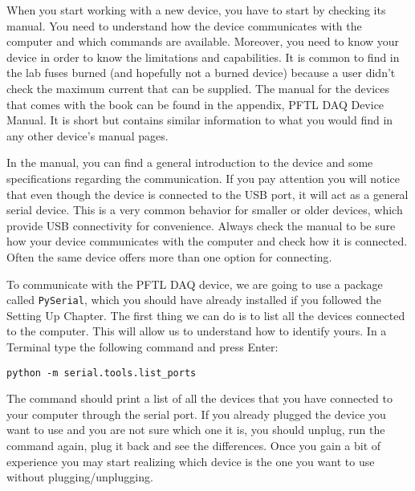 

When you start working with a new device, you have to start by checking
its manual. You need to understand how the device communicates with the
computer and which commands are available. Moreover, you need to know
your device in order to know the limitations and capabilities. It is
common to find in the lab fuses burned (and hopefully not a burned
device) because a user didn't check the maximum current that can be
supplied. The manual for the devices that comes with the book can be
found in the appendix, PFTL DAQ Device Manual. It is short but contains similar information to what you
would find in any other device's manual pages.

In the manual, you can find a general introduction to the device and
some specifications regarding the communication. If you pay attention
you will notice that even though the device is connected to the {USB}
port, it will act as a general serial device. This is a very common
behavior for smaller or older devices, which provide {USB} connectivity
for convenience. Always check the manual to be sure how your device
communicates with the computer and check how it is connected. Often the
same device offers more than one option for connecting.

To communicate with the {PFTL} {DAQ} device, we are going to use a
package called \texttt{PySerial}, which you should have already
installed if you followed the Setting Up Chapter. The first
thing we can do is to list all the devices connected to the computer.
This will allow us to understand how to identify yours. In a Terminal
type the following command and press Enter:

\begin{verbatim}
python -m serial.tools.list_ports
\end{verbatim}

The command should print a list of all the devices that you have
connected to your computer through the serial port. If you already
plugged the device you want to use and you are not sure which one it is,
you should unplug, run the command again, plug it back and see the
differences. Once you gain a bit of experience you may start realizing
which device is the one you want to use without plugging/unplugging.

